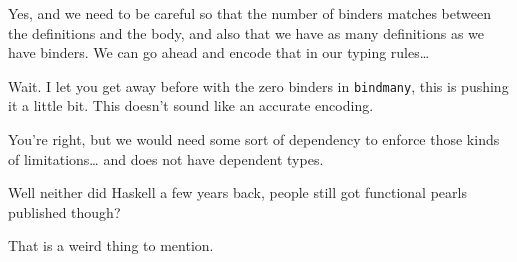 \heroADVISOR{} Yes, and we need to be careful so that the number of binders
matches between the definitions and the body, and also that we have as
many definitions as we have binders. We can go ahead and encode that in
our typing rules\ldots{}

\heroSTUDENT{} Wait. I let you get away before with the zero binders in
\texttt{bindmany}, this is pushing it a little bit. This doesn't sound
like an accurate encoding.

\heroADVISOR{} You're right, but we would need some sort of dependency to
enforce those kinds of limitations\ldots{} and \lamprolog does not have
dependent types.

\heroSTUDENT{} Well neither did Haskell a few years back, people still got
functional pearls published though?

\heroADVISOR{} That is a weird thing to mention.
